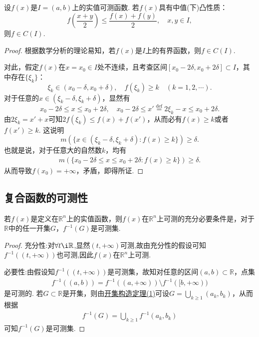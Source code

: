 \documentclass[../../main.tex]{subfiles}
\begin{document}
\begin{example}
设\(f(x)\)是\(I = (a, b)\)上的实值可测函数. 若\(f(x)\)具有中值(下)凸性质：
\[f\left(\frac{x + y}{2}\right) \leqslant \frac{f(x) + f(y)}{2}, \quad x, y \in I,\]
则\(f \in C(I)\).
\end{example}
\begin{proof}
根据数学分析的理论易知，若\(f(x)\)是\(I\)上的有界函数，则\(f \in C(I)\).

对此，假定\(f(x)\)在\(x = x_0 \in I\)处不连续，且考查区间\([x_0 - 2\delta, x_0 + 2\delta] \subset I\)，其中存在\(\{\xi_k\}\)：
\[\xi_k \in (x_0 - \delta, x_0 + \delta), \quad f(\xi_k) \geqslant k \quad (k = 1,2,\cdots).\]
对于任意的\(x \in (\xi_k - \delta, \xi_k + \delta)\)，显然有
\[x_0 - 2\delta \leqslant x \leqslant x_0 + 2\delta, \quad x_0 - 2\delta \leqslant x' \stackrel{\text{def}}{=} 2\xi_k - x \leqslant x_0 + 2\delta.\]
由\(2\xi_k = x' + x\)可知\(2f(\xi_k) \leqslant f(x) + f(x')\)，从而必有\(f(x) \geqslant k\)或者\(f(x') \geqslant k\).
这说明
\[m(\{x \in (\xi_k - \delta, \xi_k + \delta) : f(x) \geqslant k\}) \geqslant \delta.\]
也就是说，对于任意大的自然数\(k\)，均有
\begin{align*}
m(\{x_0 - 2\delta \leqslant x \leqslant x_0 + 2\delta : f(x) \geqslant k\}) \geqslant \delta.
\end{align*}
从而导致\(f(x_0) = +\infty\)，矛盾，即得所证. 
\end{proof}



\subsection{复合函数的可测性}

\begin{lemma}\label{lemma:函数可测的充要条件1}
若\(f(x)\)是定义在\(\mathbb{R}^{n}\)上的实值函数，则\(f(x)\)在\(\mathbb{R}^{n}\)上可测的充分必要条件是，对于\(\mathbb{R}\)中的任一开集\(G\)，\(f^{-1}(G)\)是可测集.
\end{lemma}
\begin{proof}
{\heiti 充分性:}对$\forall t\i \mathbb{R}$,显然$(t,+\infty)$可测,故由充分性的假设可知$f^{-1}((t,+\infty))$也可测,因此$f(x)$在$\mathbb{R}^n$上可测.

{\heiti 必要性:}由假设知\(f^{-1}((t, +\infty))\)是可测集，故知对任意的区间\((a, b) \subset \mathbb{R}\)，点集
\begin{align*}
f^{-1}((a, b)) = f^{-1}((a, +\infty)) \setminus f^{-1}([b, +\infty))
\end{align*}
是可测的. 若\(G \subset \mathbb{R}\)是开集，则由\hyperref[theorem:开集构造定理]{开集构造定理(1)}可设\(G = \bigcup_{k \geqslant 1} (a_k, b_k)\)，从而根据
\begin{align*}
f^{-1}(G) = \bigcup_{k \geqslant 1} f^{-1}(a_k, b_k)
\end{align*}
可知\(f^{-1}(G)\)是可测集.
\end{proof}
\end{document}
